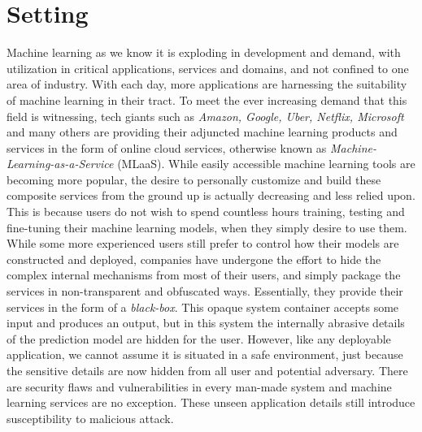 \documentclass[grad,lot,lof,11pt,oneside,onehalfspace]{RUthesis}
\begin{document}
\section{Setting}
  Machine learning as we know it is exploding in development and demand, with utilization in critical applications, services and domains, and not confined to one area of industry. With each day, more applications are harnessing the suitability of machine learning in their tract. To meet the ever increasing demand that this field is witnessing, tech giants such as \textit{Amazon, Google, Uber, Netflix, Microsoft} and many others are providing their adjuncted machine learning  products and services in the form of online cloud services, otherwise known as\textit{ Machine-Learning-as-a-Service} (MLaaS)\cite{ribeiro_mlaas:_2015}. While easily accessible machine learning tools are becoming more popular, the desire to personally customize and build these composite services from the ground up is actually decreasing and less relied upon. This is because users do not wish to spend countless hours training, testing and fine-tuning their machine learning models, when they simply desire to use them. While some more experienced  users still prefer to control how their models are constructed and deployed, companies have undergone the effort to hide the complex internal mechanisms from most of their users, and simply package the services in non-transparent and obfuscated ways. Essentially, they provide their services in the form of a \textit{black-box}\cite{kurakin_adversarial_2017}\cite{papernot_practical_2017}. This opaque system container accepts some input and produces an output, but in this system the internally abrasive details of the prediction model are hidden for the user. However, like any deployable application, we cannot assume it is situated in a safe environment, just because the sensitive details are now hidden from all user and potential adversary. There are security flaws and vulnerabilities in every man-made system and machine learning services are no exception. These unseen application details still introduce susceptibility to malicious attack. 
  
\end{document}
